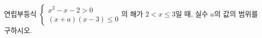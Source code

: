 연립부등식 $\begin{cases} x^2-x-2>0 \\ (x+a)(x-3)\le 0 \end{cases}$의 해가 $2<x\le 3$일 때, 실수 $a$의 값의 범위를 구하시오.
